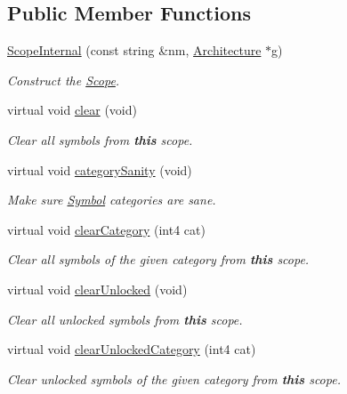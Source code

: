 \subsection*{Public Member Functions}
\begin{DoxyCompactItemize}
\item 
\mbox{\hyperlink{class_scope_internal_af6d824ff10ab3f9afcdfc1ffb206227b}{Scope\+Internal}} (const string \&nm, \mbox{\hyperlink{class_architecture}{Architecture}} $\ast$g)
\begin{DoxyCompactList}\small\item\em Construct the \mbox{\hyperlink{class_scope}{Scope}}. \end{DoxyCompactList}\item 
virtual void \mbox{\hyperlink{class_scope_internal_a3d5c9c8e68da7f36ae7e0e228b4734d2}{clear}} (void)
\begin{DoxyCompactList}\small\item\em Clear all symbols from {\bfseries{this}} scope. \end{DoxyCompactList}\item 
virtual void \mbox{\hyperlink{class_scope_internal_a7093bf1f5daeac84fc971fc6ab352224}{category\+Sanity}} (void)
\begin{DoxyCompactList}\small\item\em Make sure \mbox{\hyperlink{class_symbol}{Symbol}} categories are sane. \end{DoxyCompactList}\item 
virtual void \mbox{\hyperlink{class_scope_internal_a4139d0dd5d98849bd42291246cdb2f9a}{clear\+Category}} (int4 cat)
\begin{DoxyCompactList}\small\item\em Clear all symbols of the given category from {\bfseries{this}} scope. \end{DoxyCompactList}\item 
virtual void \mbox{\hyperlink{class_scope_internal_ab95e3712f0b536e014bfb3c8d3d2287a}{clear\+Unlocked}} (void)
\begin{DoxyCompactList}\small\item\em Clear all unlocked symbols from {\bfseries{this}} scope. \end{DoxyCompactList}\item 
virtual void \mbox{\hyperlink{class_scope_internal_ac73cc9a432d1e7a383c9758486ffe58d}{clear\+Unlocked\+Category}} (int4 cat)
\begin{DoxyCompactList}\small\item\em Clear unlocked symbols of the given category from {\bfseries{this}} scope. \end{DoxyCompactList}\item 

\end{DoxyCompactItemize}
